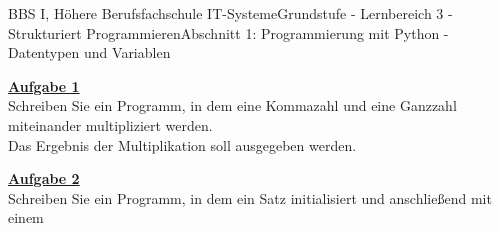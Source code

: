 \documentclass[oneside,openany,headings=optiontotoc,11pt,numbers=noenddot]{scrreprt}
\begin{document}
		\begin{worksheet}{BBS I, Höhere Berufsfachschule IT-Systeme}{Grundstufe - Lernbereich 3 - Strukturiert Programmieren}{Abschnitt 1: Programmierung mit Python - Datentypen und Variablen}
			\par\noindent
			\begin{framed}
				\noindent
				\underline{\textbf{Aufgabe 1}}\\
				Schreiben Sie ein Programm, in dem eine Kommazahl und eine Ganzzahl miteinander multipliziert werden.\\
				Das Ergebnis der Multiplikation soll ausgegeben werden.\\
				\par\noindent
				\underline{\textbf{Aufgabe 2}}\\
				Schreiben Sie ein Programm, in dem ein Satz initialisiert und anschließend mit einem 
			\end{framed}
		\end{worksheet}
\end{document}
